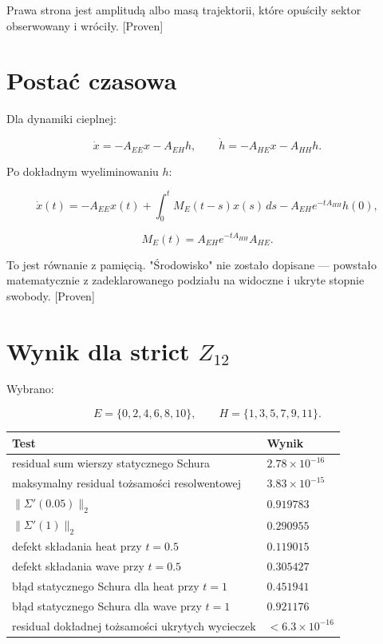 \documentclass[11pt,a4paper,openany]{report}
\newcommand{\statusProven}{\textcolor{fingreen}{[Proven]}}
\begin{document}
Prawa strona jest amplitudą albo masą trajektorii, które opuściły sektor obserwowany i wróciły. \statusProven{}

\section{Postać czasowa}

Dla dynamiki cieplnej:

\[
\dot x=-A_{EE}x-A_{EH}h,\qquad
\dot h=-A_{HE}x-A_{HH}h.
\]

Po dokładnym wyeliminowaniu \(h\):

\[
\dot x(t)
=-A_{EE}x(t)
+\int_0^t
M_E(t-s)x(s)\,ds
-A_{EH}e^{-tA_{HH}}h(0),
\]

\[
M_E(t)=A_{EH}e^{-tA_{HH}}A_{HE}.
\]

To jest równanie z pamięcią. "Środowisko" nie zostało dopisane --- powstało matematycznie z zadeklarowanego podziału na widoczne i ukryte stopnie swobody. \statusProven{}

\section{\texorpdfstring{Wynik dla strict \(Z_{12}\)}{Wynik dla strict Z\_12}}

Wybrano:

\[
E=\{0,2,4,6,8,10\},\qquad
H=\{1,3,5,7,9,11\}.
\]

\begin{center}
\begingroup\small
\setlength{\tabcolsep}{3.5pt}
\renewcommand{\arraystretch}{1.16}
\begin{longtable}{@{}p{}p{}@{}}
\toprule
\textbf{Test} & \textbf{Wynik} \\
\midrule
\endhead
residual sum wierszy statycznego Schura & \(2.78\times10^{-16}\) \\
maksymalny residual to\.zsamości resolwentowej & \(3.83\times10^{-15}\) \\
\(\|\Sigma'(0.05)\|_2\) & \(0.919783\) \\
\(\|\Sigma'(1)\|_2\) & \(0.290955\) \\
defekt składania heat przy \(t=0.5\) & \(0.119015\) \\
defekt składania wave przy \(t=0.5\) & \(0.305427\) \\
błąd statycznego Schura dla heat przy \(t=1\) & \(0.451941\) \\
błąd statycznego Schura dla wave przy \(t=1\) & \(0.921176\) \\
residual dokładnej to\.zsamości ukrytych wycieczek & \(<6.3\times10^{-16}\) \\
\bottomrule
\end{longtable}
\endgroup
\end{center}
\end{document}
